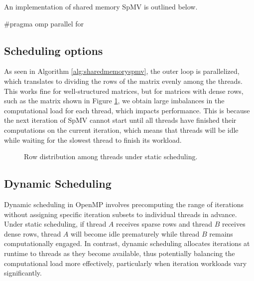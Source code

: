 An implementation of shared memory SpMV is outlined below.
\medskip

\begin{algorithm}[H]
    \caption{Shared Memory CSR-based SpMV}
    \SetAlgoVlined

    \#pragma omp parallel for\\
    \label{alg:sharedmemoryspmv}
\end{algorithm}

\subsection{Scheduling options}
\label{sec:schedulingoptions}
As seen in Algorithm \ref{alg:sharedmemoryspmv}, the outer loop is parallelized, which translates to dividing the rows of the matrix evenly among the threads. This works fine for well-structured matrices, but for matrices with dense rows, such as the matrix shown in Figure \ref{fig:staticscheduling}, we obtain large imbalances in the computational load for each thread, which impacts performance. This is because the next iteration of SpMV cannot start until all threads have finished their computations on the current iteration, which means that threads will be idle while waiting for the slowest thread to finish its workload.

\begin{figure}[H]
    \centering
    \caption{Row distribution among threads under static scheduling.}
    \label{fig:staticscheduling}
\end{figure}

\subsection{Dynamic Scheduling}

Dynamic scheduling in OpenMP involves precomputing the range of iterations without assigning specific iteration subsets to individual threads in advance. Under static scheduling, if thread \(A\) receives sparse rows and thread \(B\) receives dense rows, thread \(A\) will become idle prematurely while thread \(B\) remains computationally engaged. In contrast, dynamic scheduling allocates iterations at runtime to threads as they become available, thus potentially balancing the computational load more effectively, particularly when iteration workloads vary significantly.
\medskip

